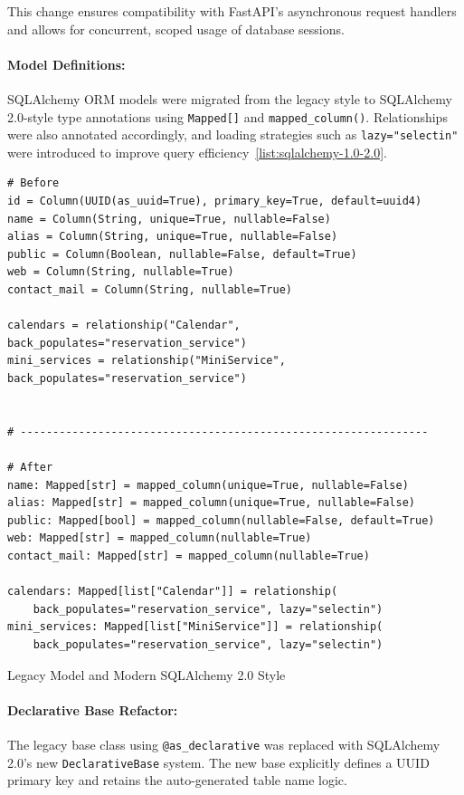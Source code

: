 This change ensures compatibility with FastAPI's asynchronous request handlers and allows for concurrent, scoped usage of database sessions.

\paragraph{Model Definitions:}
SQLAlchemy ORM models were migrated from the legacy style to SQLAlchemy 2.0-style type annotations using \texttt{Mapped[]} and \texttt{mapped\_column()}. Relationships were also annotated accordingly, and loading strategies such as \texttt{lazy="selectin"} were introduced to improve query efficiency~\ref{list:sqlalchemy-1.0-2.0}.

\begin{listing}
  \begin{verbatim}
# Before
id = Column(UUID(as_uuid=True), primary_key=True, default=uuid4)
name = Column(String, unique=True, nullable=False)
alias = Column(String, unique=True, nullable=False)
public = Column(Boolean, nullable=False, default=True)
web = Column(String, nullable=True)
contact_mail = Column(String, nullable=True)

calendars = relationship("Calendar", back_populates="reservation_service")
mini_services = relationship("MiniService", back_populates="reservation_service")


# ---------------------------------------------------------------

# After
name: Mapped[str] = mapped_column(unique=True, nullable=False)
alias: Mapped[str] = mapped_column(unique=True, nullable=False)
public: Mapped[bool] = mapped_column(nullable=False, default=True)
web: Mapped[str] = mapped_column(nullable=True)
contact_mail: Mapped[str] = mapped_column(nullable=True)

calendars: Mapped[list["Calendar"]] = relationship(
    back_populates="reservation_service", lazy="selectin")
mini_services: Mapped[list["MiniService"]] = relationship(
    back_populates="reservation_service", lazy="selectin")
\end{verbatim}
\caption{Legacy Model and Modern SQLAlchemy 2.0 Style}
\label{list:sqlalchemy-1.0-2.0}
\end{listing}

\paragraph{Declarative Base Refactor:}
The legacy base class using \texttt{@as\_declarative} was replaced with SQLAlchemy 2.0's new \texttt{DeclarativeBase} system. The new base explicitly defines a UUID primary key and retains the auto-generated table name logic.

